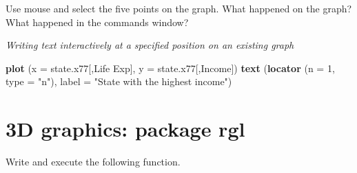 \documentclass[
]{book}
\newenvironment{Shaded}{\begin{snugshade}}{\end{snugshade}}
\newcommand{\AttributeTok}[1]{\textcolor[rgb]{0.13,0.29,0.53}{#1}}
\newcommand{\DecValTok}[1]{\textcolor[rgb]{0.00,0.00,0.81}{#1}}
\newcommand{\FunctionTok}[1]{\textcolor[rgb]{0.13,0.29,0.53}{\textbf{#1}}}
\newcommand{\NormalTok}[1]{#1}
\newcommand{\StringTok}[1]{\textcolor[rgb]{0.31,0.60,0.02}{#1}}
\begin{document}
Use mouse and select the five points on the graph. What happened on the graph? What happened in the commands window?

\emph{Writing text interactively at a specified position on an existing graph}

\begin{Shaded}
\begin{Highlighting}[]
\FunctionTok{plot}\NormalTok{ (}\AttributeTok{x =}\NormalTok{ state.x77[,}\StringTok{\textquotesingle{}Life Exp\textquotesingle{}}\NormalTok{], }\AttributeTok{y =}\NormalTok{ state.x77[,}\StringTok{\textquotesingle{}Income\textquotesingle{}}\NormalTok{])}
\FunctionTok{text}\NormalTok{ (}\FunctionTok{locator}\NormalTok{ (}\AttributeTok{n =} \DecValTok{1}\NormalTok{, }\AttributeTok{type =} \StringTok{"n"}\NormalTok{), }\AttributeTok{label =} \StringTok{"State with the highest income"}\NormalTok{)}
\end{Highlighting}
\end{Shaded}

\section{3D graphics: package rgl}\label{d-graphics-package-rgl}

Write and execute the following function.
\end{document}
